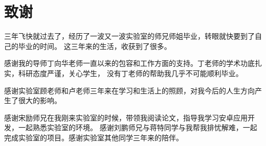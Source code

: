 \chapter{致谢}

三年飞快就过去了，经历了一波又一波实验室的师兄师姐毕业，转眼就快要到了自己的毕业的时间。 这三年来的生活，收获到了很多。

感谢我的导师丁向华老师一直以来的包容和工作方面的支持。丁老师的学术功底扎实，科研态度严谨，关心学生， 没有丁老师的帮助我几乎不可能顺利毕业。

感谢实验室顾老师和卢老师三年来在学习和生活上的照顾，对我今后的人生方向产生了很大的影响。

感谢宋励师兄在我刚来实验室的时候，带领我阅读论文，指导我学习安卓应用开发，一起熟悉实验室的环境。 感谢刘鹏师兄与蒋特同学与我帮我排忧解难，一起完成实验室的项目。感谢实验室其他同学三年来的陪伴。

